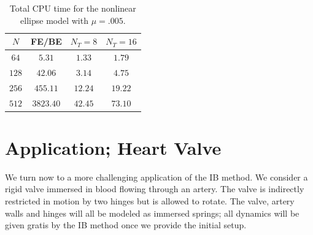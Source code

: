 \documentclass[preprint,12pt]{elsarticle}
\begin{document}
\begin{table}
\caption{Total CPU time for the nonlinear ellipse model with $\mu=.005$.}
\label{table:NonlinearEllipseSims_005CPU}
\begin{center}
\begin{tabular}{|c||c| c c|}
\hline
$N$ & FE/BE & $N_T = 8$ & $N_T = 16$\\
\hline
$64$ & $5.31$ & $1.33$ & $1.79$ \\
$128$ & $42.06$ & $3.14$ & $4.75$ \\
$256$ & $455.11$ & $12.24$ & $19.22$ \\
$512$ & $3823.40$ & $42.45$ & $73.10$ \\
\hline
\end{tabular}
\end{center}
\end{table}













































































\section{Application; Heart Valve}
\label{Sec:valve}
We turn now to a more challenging application of the IB method. We consider a rigid valve immersed in blood flowing through an artery. The valve is indirectly restricted in motion by two hinges but is allowed to rotate. The valve, artery walls and hinges will all be modeled as immersed springs; all dynamics will be given gratis by the IB method once we provide the initial setup.
\end{document}
